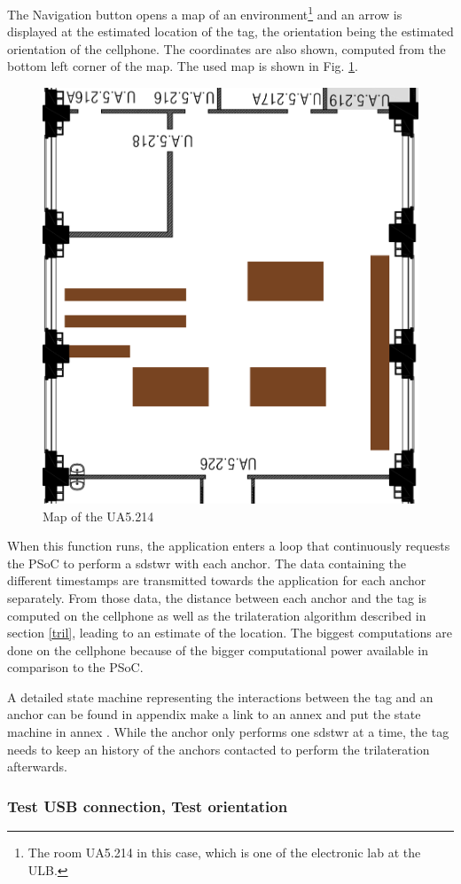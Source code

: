 The Navigation button opens a map of an environment\footnote{The room UA5.214 in this case, which is one of the electronic lab at the ULB.} and an arrow is displayed at the estimated location of the tag, the orientation being the estimated orientation of the cellphone. The coordinates are also shown, computed from the bottom left corner of the map. The used map is shown in Fig. \ref{fig:ua5_map}.

\begin{figure}[H]
	\centering
	\includegraphics[width=.4\linewidth]{Images/little_room.png}
	\caption{Map of the UA5.214}
	\label{fig:ua5_map}
\end{figure}

When this function runs, the application enters a loop that continuously requests the PSoC to perform a \gls{sdstwr} with each anchor. The data containing the different timestamps are transmitted towards the application for each anchor separately. From those data, the distance between each anchor and the tag is computed on the cellphone as well as the trilateration algorithm described in section \ref{tril}, leading to an estimate of the location. The biggest computations are done on the cellphone because of the bigger computational power available in comparison to the PSoC.
\vspace{2mm}

A detailed state machine representing the interactions between the tag and an anchor can be found in appendix \color{red} make a link to an annex and put the state machine in annex \color{black}  \cite{hannotier2019indoor}. While the anchor only performs one \gls{sdstwr} at a time, the tag needs to keep an history of the anchors contacted to perform the trilateration afterwards.

\subsubsection{Test USB connection, Test orientation}

